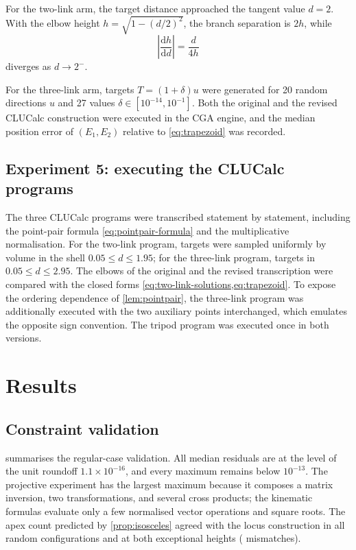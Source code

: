 \documentclass[11pt,a4paper]{article}
\theoremstyle{plain}
\theoremstyle{definition}
\theoremstyle{remark}
\newcommand{\abs}[1]{\left\lvert#1\right\rvert}
\begin{document}
For the two-link arm, the target distance approached the tangent value $d=2$.
With the elbow height $h=\sqrt{1-(d/2)^2}$, the branch separation is $2h$,
while
\begin{equation}
  \abs{\frac{\mathrm dh}{\mathrm dd}}=\frac{d}{4h}
  \label{eq:elbow-sensitivity}
\end{equation}
diverges as $d\to2^-$.

For the three-link arm, targets $T=(1+\delta)u$ were generated for 20 random
directions $u$ and 27 values $\delta\in[10^{-14},10^{-1}]$. Both the original
and the revised CLUCalc construction were executed in the CGA engine, and the
median position error of $(E_1,E_2)$ relative to \cref{eq:trapezoid} was
recorded.

\subsection{Experiment 5: executing the CLUCalc programs}\label{sec:exp-cga}

The three CLUCalc programs were transcribed statement by statement, including
the point-pair formula \cref{eq:pointpair-formula} and the multiplicative
normalisation. For the two-link program, \CGATrials{} targets were sampled
uniformly by volume in the shell $0.05\le d\le1.95$; for the three-link
program, \CGATrials{} targets in $0.05\le d\le2.95$. The elbows of the original
and the revised transcription were compared with the closed forms
\cref{eq:two-link-solutions,eq:trapezoid}. To expose the ordering dependence
of \cref{lem:pointpair}, the three-link program was additionally executed with
the two auxiliary points interchanged, which emulates the opposite sign
convention. The tripod program was executed once in both versions.

\section{Results}\label{sec:results}

\subsection{Constraint validation}

 summarises the regular-case validation. All median
residuals are at the level of the unit roundoff $1.1\times10^{-16}$, and every
maximum remains below $10^{-13}$. The projective experiment has the largest
maximum because it composes a matrix inversion, two transformations, and
several cross products; the kinematic formulas evaluate only a few normalised
vector operations and square roots. The apex count predicted by
\cref{prop:isosceles} agreed with the locus construction in all \IsoTrials{}
random configurations and at both exceptional heights (\IsoMismatch{}
mismatches).
\end{document}

